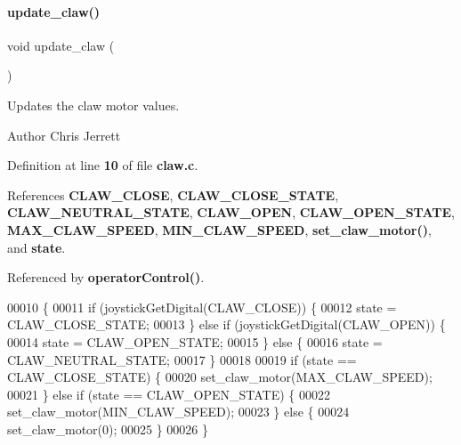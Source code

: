 \paragraph{update\+\_\+claw()}
{\footnotesize\ttfamily void update\+\_\+claw (\begin{DoxyParamCaption}{ }\end{DoxyParamCaption})}



Updates the claw motor values. 

\begin{DoxyAuthor}{Author}
Chris Jerrett 
\end{DoxyAuthor}


Definition at line \textbf{ 10} of file \textbf{ claw.\+c}.



References \textbf{ C\+L\+A\+W\+\_\+\+C\+L\+O\+SE}, \textbf{ C\+L\+A\+W\+\_\+\+C\+L\+O\+S\+E\+\_\+\+S\+T\+A\+TE}, \textbf{ C\+L\+A\+W\+\_\+\+N\+E\+U\+T\+R\+A\+L\+\_\+\+S\+T\+A\+TE}, \textbf{ C\+L\+A\+W\+\_\+\+O\+P\+EN}, \textbf{ C\+L\+A\+W\+\_\+\+O\+P\+E\+N\+\_\+\+S\+T\+A\+TE}, \textbf{ M\+A\+X\+\_\+\+C\+L\+A\+W\+\_\+\+S\+P\+E\+ED}, \textbf{ M\+I\+N\+\_\+\+C\+L\+A\+W\+\_\+\+S\+P\+E\+ED}, \textbf{ set\+\_\+claw\+\_\+motor()}, and \textbf{ state}.



Referenced by \textbf{ operator\+Control()}.


\begin{DoxyCode}
00010                    \{
00011   \textcolor{keywordflow}{if} (joystickGetDigital(CLAW_CLOSE)) \{
00012     state = CLAW_CLOSE_STATE;
00013   \} \textcolor{keywordflow}{else} \textcolor{keywordflow}{if} (joystickGetDigital(CLAW_OPEN)) \{
00014     state = CLAW_OPEN_STATE;
00015   \} \textcolor{keywordflow}{else} \{
00016     state = CLAW_NEUTRAL_STATE;
00017   \}
00018 
00019   \textcolor{keywordflow}{if} (state == CLAW_CLOSE_STATE) \{
00020     set_claw_motor(MAX_CLAW_SPEED);
00021   \} \textcolor{keywordflow}{else} \textcolor{keywordflow}{if} (state == CLAW_OPEN_STATE) \{
00022     set_claw_motor(MIN_CLAW_SPEED);
00023   \} \textcolor{keywordflow}{else} \{
00024     set_claw_motor(0);
00025   \}
00026 \}
\end{DoxyCode}
